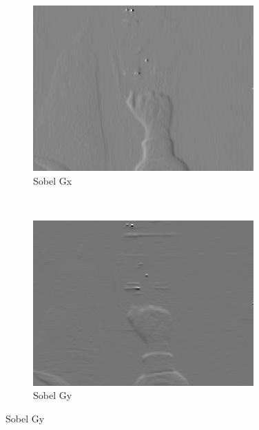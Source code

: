 \begin{figure}
    \begin{subfigure}[b]{0.3\textwidth}
        \includegraphics[width=\textwidth]{image/gradiente_sobel_gx.jpg}
        \caption{Sobel Gx}
        \label{fig:gradiente_gx}
    \end{subfigure}
    ~ %
    \begin{subfigure}[b]{0.3\textwidth}
        \includegraphics[width=\textwidth]{image/gradiente_sobel_gy.jpg}
        \caption{Sobel Gy}
        \label{fig:gradiente_gy}
    \end{subfigure}

\end{figure}

